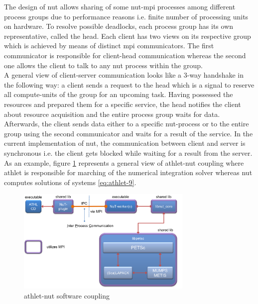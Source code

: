 The design of \acrshort{nut} allows sharing of some \acrshort{nut}-\acrshort{mpi} processes among different process groups due to performance reasons i.e. finite number of processing units on hardware. To resolve possible deadlocks, each process group has its own representative, called the head. Each client has two views on its respective group which is achieved by means of distinct \acrshort{mpi} communicators. The first communicator is responsible for client-head communication whereas the second one allows the client to talk to any \acrshort{nut} process within the group.\\



A general view of client-server communication looks like a 3-way handshake in the following way: a client sends a request to the head which is a signal to reserve all compute-units of the group for an upcoming task. Having possessed the resources and prepared them for a specific service, the head notifies the client about resource acquisition and the entire process group waits for data. Afterwards, the client sends data either to a specific \acrshort{nut}-process or to the entire group using the second communicator and waits for a result of the service. In the current implementation of \acrshort{nut}, the communication between client and server is synchronous i.e. the client gets blocked while waiting for a result from the server. \\


As an example, figure \ref{fig:introduction-athlet-nut-coupling} represents a general view of \acrshort{athlet}-\acrshort{nut} coupling where \acrshort{athlet} is responsible for marching of the numerical integration solver whereas \acrshort{nut} computes solutions of systems \ref{eq:athlet-9}.\\


\figpointer{\ref{fig:introduction-athlet-nut-coupling}}
\begin{figure}
  \centering
  \includegraphics[width=0.75\textwidth]{figures/introduction-athlet-nut-coupling.png}
    \caption{\acrshort{athlet}-\acrshort{nut} software coupling}
\label{fig:introduction-athlet-nut-coupling}
\end{figure}


